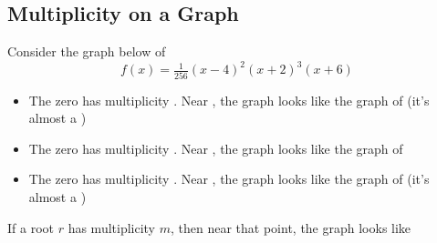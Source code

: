 \subsection{Multiplicity on a Graph} 
Consider the graph below of
\[
f(x)=\tfrac{1}{256}\left(x-4\right)^2\left(x+2\right)^3\left(x+6\right)
\]
\begin{center}\end{center}
\begin{itemize}
\item The zero \makeblanksmall has multiplicity \makeblanksmall. Near \blankpair, the graph looks like the graph of \makeblank[1in] (it's almost a \makeblank[1.5in])
\item The zero \makeblanksmall has multiplicity \makeblanksmall. Near \blankpair, the graph looks like the graph of \makeblank[1in]
\item The zero \makeblanksmall has multiplicity \makeblanksmall. Near \blankpair, the graph looks like the graph of \makeblank[1in] (it's almost a \makeblank[1.5in])
\end{itemize}
If a root $r$ has multiplicity $m$, then near that point, the graph looks like \makeblank[1in]